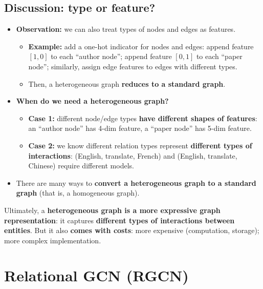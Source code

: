 \subsection{Discussion: type or feature?}\label{sec:lec09-typefeat}

\begin{itemize}
  \item \textbf{Observation:} we can also treat types of nodes and edges as
    features.
    \begin{itemize}
      \item \textbf{Example:} add a one-hot indicator for nodes and edges: append
        feature $[1,0]$ to each ``author node''; append feature $[0,1]$ to each
        ``paper node''; similarly, assign edge features to edges with different
        types.
      \item Then, a heterogeneous graph \textbf{reduces to a standard graph}.
    \end{itemize}
  \item \textbf{When do we need a heterogeneous graph?}
    \begin{itemize}
      \item \textbf{Case 1:} different node/edge types \textbf{have different
        shapes of features}: an ``author node'' has 4-dim feature, a ``paper
        node'' has 5-dim feature.
      \item \textbf{Case 2:} we know different relation types represent
        \textbf{different types of interactions}: (English, translate, French)
        and (English, translate, Chinese) require different models.
    \end{itemize}
  \item There are many ways to \textbf{convert a heterogeneous graph to a
    standard graph} (that is, a homogeneous graph).
\end{itemize}
\begin{keyidea}
  Ultimately, a \textbf{heterogeneous graph is a more expressive graph
  representation}: it captures \textbf{different types of interactions between
  entities}. But it also \textbf{comes with costs}: more expensive (computation,
  storage); more complex implementation.
\end{keyidea}

\section{Relational GCN (RGCN)}\label{sec:lec09-rgcn}

